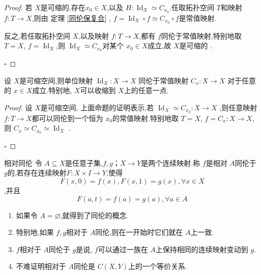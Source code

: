 \documentclass[../../几何与拓扑.tex]{subfiles}
\begin{document}
\begin{proof}

    若 \(  X  \)是可缩的,存在\(  x_0 \in X  \),以及 \(  H: \operatorname{Id}_{X}\simeq  C_{x_0}  \).任取拓扑空间 \(  T  \)和映射 \(  f: T\to X  \),则由 定理 \ref{同伦保复合} , \(  f =  \operatorname{Id}_{X}\circ f  \simeq C_{x_0}\circ f\)是常值映射.
    
    
    反之,若任取拓扑空间 \(  X  \),以及映射 \(  f: T\to X  \),都有 \(  f  \)同伦于常值映射,特别地取 \(  T =  X  \), \(  f= \operatorname{Id}_{X}  \),则 \(  \operatorname{Id}_{X}\simeq  C_{x_0}  \)对某个 \(  x_0 \in X  \)成立,故 \(  X  \)是可缩的       .   

    \hfill $\square$
\end{proof}


\begin{corollary}
    设 \(  X  \)是可缩空间,则单位映射 \(  \operatorname{Id}_{X}: X\to X  \)  同伦于常值映射 \(  C_{x}: X\to X  \)  对于任意的 \(  x \in X  \)成立.特别地, \(  X  \)可以收缩到 \(  X  \)上的任意一点.      
\end{corollary}

\begin{proof}

    设 \(  X  \)是可缩空间, 上面命题的证明表示,若 \(  \operatorname{Id}_{X}\simeq  C_{x_0}: X \to X  \) ,则任意映射 \(  f: T\to X  \)都可以同伦到一个恒为 \(  x_0  \)的常值映射.特别地取 \(  T =  X  \), \(  f =  C_{x}: X \to X  \),则 \(  C_{x}\simeq  C_{x_0}  \simeq  \operatorname{Id}_{X}\)  .    

    \hfill $\square$
\end{proof}

\begin{definition}{相对同伦}
    令 \(  A\subseteq X  \)是任意子集,\(  f,g；X \to Y  \)是两个连续映射.称 \(  f  \)是相对 \(  A  \)同伦于 \(  g  \)的,若存在连续映射\(  F  :X\times I\to Y\),使得  \[
    F\left( x,0 \right)= f\left( x \right),F\left( x,1 \right)= g\left( x \right),\forall x \in X    
    \],并且 \[
    F\left( a,t \right)= f\left( a \right)= g\left( a \right),\forall    a \in A   
    \]      
\end{definition}

\begin{remark}
    \begin{enumerate}
        \item 如果令 \(  A   =  \varnothing\),就得到了同伦的概念.
        \item 特别地,如果 \(  f,g  \)相对于 \(  A  \)同伦,则在一开始时它们就在 \(  A  \)上一致.
        \item \(  f  \)相对于 \(  A  \)同伦于 \(  g  \)是说, \(  f  \)可以通过一族在 \(  A  \)上保持相同的连续映射变动到 \(  g  \).
        \item 不难证明相对于 \(  A  \)同伦是 \(  C\left( X,Y \right)   \)上的一个等价关系.            
    \end{enumerate}
    
\end{remark}
\end{document}
